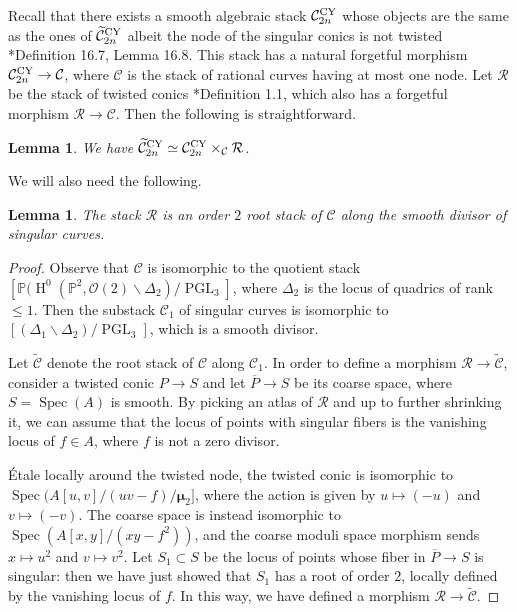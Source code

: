 \documentclass{amsart}
\newcommand{\bP}{\mathbb{P}}
\newcommand{\oH}{\operatorname{H}}
\newcommand{\cC}{\mathcal{C}}
\newcommand{\cO}{\mathcal{O}}
\newcommand{\cR}{\mathcal{R}}
\newcommand{\spec}{\operatorname{Spec}}
\newcommand{\PGL}{\operatorname{PGL}}
\newcommand{\bmu}{\bm{\mu}}
\newcommand{\Ctilde}{\widetilde{\mathcal{C}}}
\newcommand{\CY}{{\rm CY}}
\newtheorem{Lemma}[theorem]{Lemma}
\theoremstyle{definition}
\theoremstyle{definition}
\begin{document}
{Recall that there exists a smooth algebraic stack $\cC^{\CY}_{2n}$ whose objects are the same as the ones of $\Ctilde_{2n}^{\CY}$ albeit the node of the singular conics is not twisted \cite{ascher2023moduli}*{Definition 16.7, Lemma 16.8}. This stack has a natural forgetful morphism $\cC^{\CY}_{2n} \to \cC$, where $\cC$ is the stack of rational curves having at most one node.
Let $\cR$ be the stack of twisted conics \cite{DLV}*{Definition 1.1}, which also has a forgetful morphism $\cR\to \cC$. Then the following is straightforward.
\begin{Lemma}\label{lm:cartesian}
    We have $\Ctilde^{\CY}_{2n} \simeq \cC^{\CY}_{2n} \times_{\cC} \cR$.
\end{Lemma}
We will also need the following.
\begin{Lemma}\label{lm:root}
    The stack $\cR$ is an order $2$ root stack of $\cC$ along the smooth divisor of singular curves.
\end{Lemma}
\begin{proof}
    Observe that $\cC$ is isomorphic to the quotient stack $[\bP (\oH^0(\bP^2,\cO(2) \smallsetminus \Delta_2)/\PGL_3]$, where $\Delta_2$ is the locus of quadrics of rank $\leq 1$. Then the substack $\cC_1$ of singular curves is isomorphic to $[(\Delta_1\smallsetminus\Delta_2)/\PGL_3]$, which is a smooth divisor.
    
    Let $\Ctilde$ denote the root stack of $\cC$ along $\cC_1$. In order to define a morphism $\cR\to \Ctilde$, consider a twisted conic $P\to S$ and let $\overline{P}\to S$ be its coarse space, where $S=\spec(A)$ is smooth. By picking an atlas of $\cR$ and up to further shrinking it, we can assume that the locus of points with singular fibers is the vanishing locus of $f\in A$, where $f$ is not a zero divisor.
    
    \'{E}tale locally around the twisted node, the twisted conic is isomorphic to $\spec(A[u,v]/(uv-f)/\bmu_2]$, where the action is given by $u\mapsto (-u)$ and $v\mapsto (-v)$. The coarse space is instead isomorphic to $\spec(A[x,y]/(xy-f^2))$, and the coarse moduli space morphism sends $x\mapsto u^2$ and $v\mapsto v^2$. Let $S_1\subset S$ be the locus of points whose fiber in $\overline{P}\to S$ is singular: then we have just showed that $S_1$ has a root of order $2$, locally defined by the vanishing locus of $f$. In this way, we have defined a morphism $\cR \to \widetilde{\cC}$.


\end{proof}}
\end{document}
